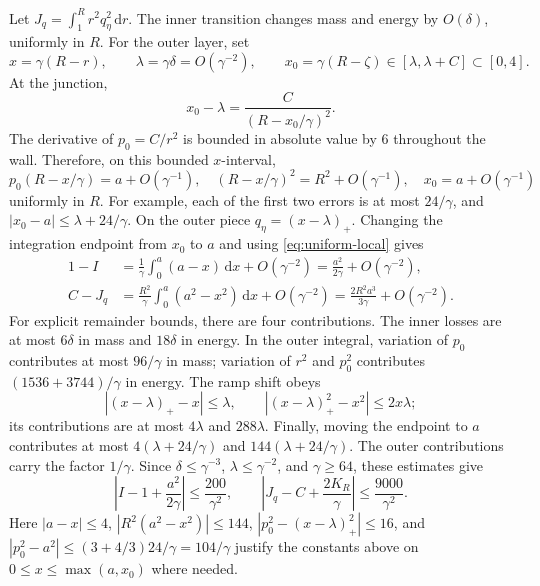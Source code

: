 \documentclass[11pt,a4paper]{article}
\newcommand{\dd}{\,\mathrm d}
\numberwithin{equation}{section}
\begin{document}
Let \(J_q=\int_1^R r^2q_\eta^2\dd r\).
The inner transition changes mass and energy by \(O(\delta)\),
uniformly in \(R\). For the outer layer, set
\[
 x=\gamma(R-r),\qquad \lambda=\gamma\delta=O(\gamma^{-2}),
 \qquad x_0=\gamma(R-\zeta)\in[\lambda,\lambda+C]\subset[0,4].
\]
At the junction,
\[
 x_0-\lambda=\frac{C}{(R-x_0/\gamma)^2}.
\]
The derivative of \(p_0=C/r^2\) is bounded in absolute value by 6
throughout the wall. Therefore, on this bounded \(x\)-interval,
\begin{equation}\label{eq:uniform-local}
 p_0(R-x/\gamma)=a+O(\gamma^{-1}),\quad
 (R-x/\gamma)^2=R^2+O(\gamma^{-1}),\quad
 x_0=a+O(\gamma^{-1})
\end{equation}
uniformly in \(R\). For example, each of the first two errors is at
most \(24/\gamma\), and \(|x_0-a|\le\lambda+24/\gamma\).
On the outer piece \(q_\eta=(x-\lambda)_+\). Changing the integration
endpoint from \(x_0\) to \(a\) and using
\eqref{eq:uniform-local} gives
\begin{align}
 1-I&=\frac1\gamma\int_0^a(a-x)\dd x+O(\gamma^{-2})
       =\frac{a^2}{2\gamma}+O(\gamma^{-2}),\label{eq:mass-exp}\\
 C-J_q&=\frac{R^2}{\gamma}\int_0^a(a^2-x^2)\dd x+O(\gamma^{-2})
       =\frac{2R^2a^3}{3\gamma}+O(\gamma^{-2}).\label{eq:energy-exp}
\end{align}
For explicit remainder bounds, there are four contributions. The inner
losses are at most \(6\delta\) in mass and \(18\delta\) in energy.
In the outer integral, variation of \(p_0\) contributes at most
\(96/\gamma\) in mass; variation of \(r^2\) and \(p_0^2\) contributes
\((1536+3744)/\gamma\) in energy. The ramp shift obeys
\[
 |(x-\lambda)_+-x|\le\lambda,\qquad
 |(x-\lambda)_+^2-x^2|\le2x\lambda;
\]
its contributions are at most \(4\lambda\) and \(288\lambda\).
Finally, moving the endpoint to \(a\) contributes at most
\(4(\lambda+24/\gamma)\) and \(144(\lambda+24/\gamma)\).
The outer contributions carry the factor \(1/\gamma\). Since
\(\delta\le\gamma^{-3}\), \(\lambda\le\gamma^{-2}\), and \(\gamma\ge64\),
these estimates give
\begin{equation}\label{eq:explicit-remainders}
 \left|I-1+\frac{a^2}{2\gamma}\right|\le\frac{200}{\gamma^2},
 \qquad
 \left|J_q-C+\frac{2K_R}{\gamma}\right|\le\frac{9000}{\gamma^2}.
\end{equation}
Here \(|a-x|\le4\), \(|R^2(a^2-x^2)|\le144\),
\(|p_0^2-(x-\lambda)_+^2|\le16\), and
\(|p_0^2-a^2|\le(3+4/3)24/\gamma=104/\gamma\)
justify the constants above on \(0\le x\le\max(a,x_0)\) where needed.
\end{document}
